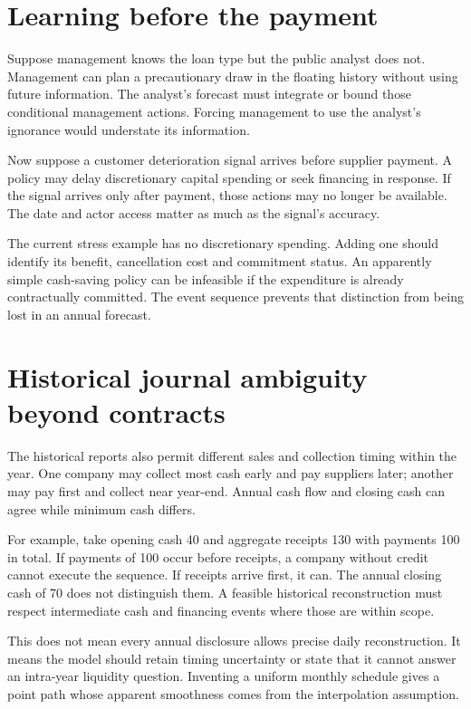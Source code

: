 \section{Learning before the payment}
Suppose management knows the loan type but the public analyst does not. Management can plan a precautionary draw in the floating history without using future information. The analyst's forecast must integrate or bound those conditional management actions. Forcing management to use the analyst's ignorance would understate its information.

Now suppose a customer deterioration signal arrives before supplier payment. A policy may delay discretionary capital spending or seek financing in response. If the signal arrives only after payment, those actions may no longer be available. The date and actor access matter as much as the signal's accuracy.

The current stress example has no discretionary spending. Adding one should identify its benefit, cancellation cost and commitment status. An apparently simple cash-saving policy can be infeasible if the expenditure is already contractually committed. The event sequence prevents that distinction from being lost in an annual forecast.

\section{Historical journal ambiguity beyond contracts}
The historical reports also permit different sales and collection timing within the year. One company may collect most cash early and pay suppliers later; another may pay first and collect near year-end. Annual cash flow and closing cash can agree while minimum cash differs.

For example, take opening cash 40 and aggregate receipts 130 with payments 100 in total. If payments of 100 occur before receipts, a company without credit cannot execute the sequence. If receipts arrive first, it can. The annual closing cash of 70 does not distinguish them. A feasible historical reconstruction must respect intermediate cash and financing events where those are within scope.

This does not mean every annual disclosure allows precise daily reconstruction. It means the model should retain timing uncertainty or state that it cannot answer an intra-year liquidity question. Inventing a uniform monthly schedule gives a point path whose apparent smoothness comes from the interpolation assumption.

